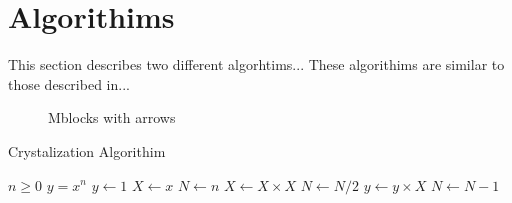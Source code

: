 \section{Algorithims}
\label{sec:Algorithims}

This section describes two different algorhtims... These algorithims are similar to those described in...
\begin{figure}[H]


\caption{Mblocks with arrows}
\label{fig:CubeDiagram}
\end{figure}
	
\begin{algorithm}[htbp]
\hrulefill
\caption{Crystalization Algorithim}
\label{alg1}
\hrulefill
\begin{algorithmic}
\REQUIRE $n \geq 0$
\ENSURE $y = x^n$ 
\STATE $y \leftarrow 1$
\STATE $X \leftarrow x$
\STATE $N \leftarrow n$
\STATE $X \leftarrow X \times X$
\STATE $N \leftarrow N / 2$
\ELSE[$N$ is odd]
 \STATE $y \leftarrow y \times X$
\STATE $N \leftarrow N - 1$
\ENDIF
\ENDWHILE
\end{algorithmic}
\hrulefill
\end{algorithm}